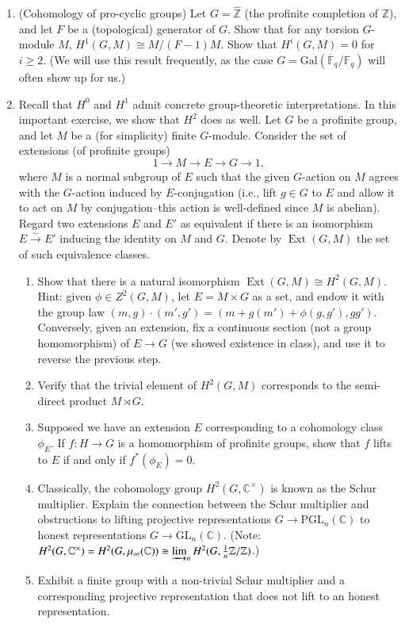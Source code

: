 \documentclass[11pt,answers,addpoints,reqno]{exam}
\theoremstyle{definition}
\theoremstyle{remark}
\theoremstyle{definition}
\theoremstyle{remark}
\theoremstyle{remark}
\theoremstyle{remark}
\newcommand{\Z}{\mathbb{Z}}
\newcommand{\CC}{\mathbb{C}}
\DeclareMathOperator{\Ext}{Ext}
\newcommand{\Gal}{\mathrm{Gal}} %
\newcommand{\mr}{\mathrm}
\begin{document}
\begin{enumerate}
\item (Cohomology of pro-cyclic groups) Let $G= \widehat{\Z}$ (the profinite completion of $\Z$), and let $F$ be a (topological) generator of $G$. Show that for any torsion $G$-module $M$, $H^1(G, M) \cong M/(F-1)M$. Show that $H^i(G, M)=0$ for $i \geq 2$. (We will use this result frequently, as the case $G= \Gal(\overline{\mathbb{F}}_q/\mathbb{F}_q)$ will often show up for us.)
\item Recall that $H^0$ and $H^1$ admit concrete group-theoretic interpretations. In this important exercise, we show that $H^2$ does as well. Let $G$ be a profinite group, and let $M$ be a (for simplicity) finite $G$-module. Consider the set of extensions (of profinite groups)
\[
 1 \to M \to E \to G \to 1,
\]
where $M$ is a normal subgroup of $E$ such that the given $G$-action on $M$ agrees with the $G$-action induced by $E$-conjugation (i.e., lift $g\in G$ to $E$ and allow it to act on $M$ by conjugation--this action is well-defined since $M$ is abelian). Regard two extensions $E$ and $E'$ as equivalent if there is an isomorphism $E \xrightarrow{\sim} E'$ inducing the identity on $M$ and $G$. Denote by $\Ext(G, M)$ the set of such equivalence classes.
\begin{enumerate}
\item Show that there is a natural isomorphism $\Ext(G, M) \cong H^2(G, M)$. Hint: given $\phi \in Z^2(G, M)$, let $E= M \times G$ as a set, and endow it with the group law $(m, g)\cdot (m', g')= (m+g(m')+\phi(g, g'), gg')$. Conversely, given an extension, fix a continuous section (not a group homomorphism) of $E \to G$ (we showed existence in class), and use it to reverse the previous step.
\item Verify that the trivial element of $H^2(G, M)$ corresponds to the semi-direct product $M \rtimes G$.
\item Supposed we have an extension $E$ corresponding to a cohomology class $\phi_E$. If $f \colon H \to G$ is a homomorphism of profinite groups, show that $f$ lifts to $E$ if and only if $f^*(\phi_E)=0$.
\item Classically, the cohomology group $H^2(G, \CC^\times)$ is known as the Schur multiplier. Explain the connection between the Schur multiplier and obstructions to lifting projective representations $G \to \mr{PGL}_n(\CC)$ to honest representations $G \to \mr{GL}_n(\CC)$. (Note: $H^2(G, \CC^\times)= H^2(G, \mu_{\infty}(\CC)) \cong \varinjlim_n H^2(G, \frac{1}{n}\Z/\Z)$.)
\item Exhibit a finite group with a non-trivial Schur multiplier and a corresponding projective representation that does not lift to an honest representation.

\end{enumerate}
\end{enumerate}
\end{document}

